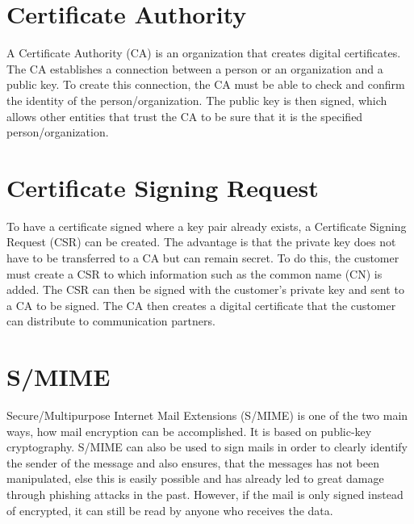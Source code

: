 \documentclass[12pt,oneside,a4paper,parskip]{scrbook}
\begin{document}
\section{Certificate Authority}
\label{sec:CA}

A Certificate Authority (CA) is an organization that creates digital certificates. The CA establishes a connection between a person or an organization and a public key. To create this connection, the CA must be able to check and confirm the identity of the person/organization. The public key is then signed, which allows other entities that trust the CA to be sure that it is the specified person/organization.
\parencite{luber_ca_2018}

\section{Certificate Signing Request}
\label{sec:CSR}

To have a certificate signed where a key pair already exists, a Certificate Signing Request (CSR) can be created. The advantage is that the private key does not have to be transferred to a CA but can remain secret. To do this, the customer must create a CSR to which information such as the common name (CN) is added. The CSR can then be signed with the customer's private key and sent to a CA to be signed. The CA then creates a digital certificate that the customer can distribute to communication partners.
\parencite{publico_ssl-grundlagen_2017}


\section{S/MIME}
Secure/Multipurpose Internet Mail Extensions (S/MIME) is one of the two main ways, how mail encryption can be accomplished. It is based on public-key cryptography. S/MIME can also be used to sign mails in order to clearly identify the sender of the message and also ensures, that the messages has not been manipulated, 
else this is easily possible and has already led to great damage through phishing attacks in the past. 
However, if the mail is only signed instead of encrypted, it can still be read by anyone who receives the data. \parencite{villadiego_dangers_2017}
\end{document}
